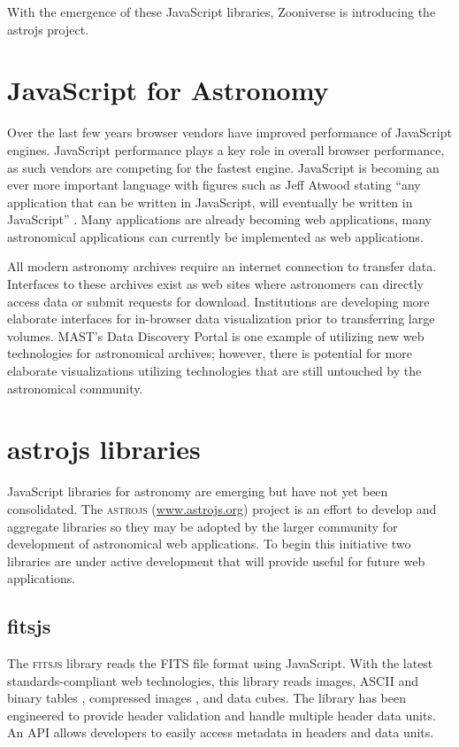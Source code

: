 With the emergence of these JavaScript libraries, Zooniverse is introducing the astrojs project.

\section{JavaScript for Astronomy}

Over the last few years browser vendors have improved performance of JavaScript engines.  JavaScript performance plays a key role in overall browser performance, as such vendors are competing for the fastest engine.  JavaScript is becoming an ever more important language with figures such as Jeff Atwood stating ``any application that can be written in JavaScript, will eventually be written in JavaScript'' \citep{Atwood}.  Many applications are already becoming web applications, many astronomical applications can currently be implemented as web applications.

All modern astronomy archives require an internet connection to transfer data.  Interfaces to these archives exist as web sites where astronomers can directly access data or submit requests for download.  Institutions are developing more elaborate interfaces for in-browser data visualization prior to transferring large volumes.  MAST's Data Discovery Portal is one example of utilizing new web technologies for astronomical archives; however, there is potential for more elaborate visualizations utilizing technologies that are still untouched by the astronomical community.

\section{astrojs libraries}

JavaScript libraries for astronomy are emerging but have not yet been consolidated.  The \textsc{astrojs} (\url{www.astrojs.org}) project is an effort to develop and aggregate libraries so they may be adopted by the larger community for development of astronomical web applications.  To begin this initiative two libraries are under active development that will provide useful for future web applications.

\subsection{fitsjs}

The \textsc{fitsjs} library reads the FITS file format \citep{2010A&A...524A..42P} using JavaScript.  With the latest standards-compliant web technologies, this library reads images, ASCII and binary tables \citep{1995A&AS..113..159C}, compressed images \citep{2012arXiv1201.1336W}, and data cubes.  The library has been engineered to provide header validation and handle multiple header data units.  An API allows developers to easily access metadata in headers and data units.

